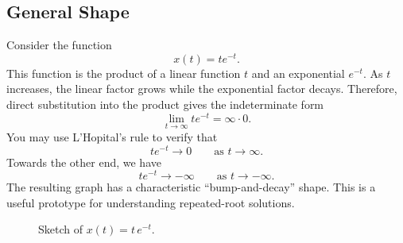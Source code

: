 \documentclass[10pt,letterpaper]{article}
\begin{document}

\subsection{General Shape}

Consider the function
\[
x(t)=te^{-t}.
\]
This function is the product of a linear function $t$ and an exponential
$e^{-t}$. As $t$ increases, the linear factor grows while the
exponential factor decays. 
Therefore, direct substitution into the product gives the indeterminate
form
\[
\lim_{t\to\infty} te^{-t} =\infty\cdot0.
\]
You may use L'Hopital's rule to verify that
\[
te^{-t}\to0
\qquad\text{as }t\to\infty.
\]
Towards the other end, we have
\[
te^{-t}\to-\infty
\qquad\text{as }t\to-\infty.
\]
The resulting graph has a characteristic ``bump-and-decay'' shape.
This is a useful prototype for understanding repeated-root solutions.
\begin{figure}[H]
    \centering
    \caption{ Sketch of $x(t)=t\,e^{-t}$. }
\end{figure}
\end{document}
